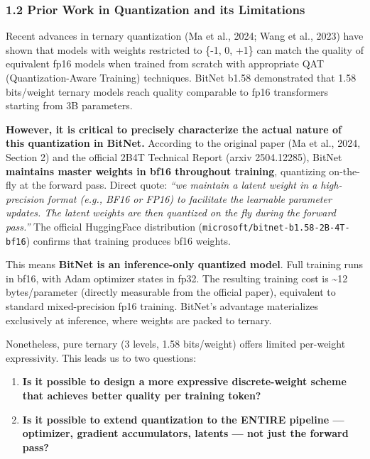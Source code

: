 \subsubsection{1.2 Prior Work in Quantization and its
Limitations}\label{prior-work-in-quantization-and-its-limitations}

Recent advances in ternary quantization (Ma et al., 2024; Wang et al.,
2023) have shown that models with weights restricted to \{-1, 0, +1\}
can match the quality of equivalent fp16 models when trained from
scratch with appropriate QAT (Quantization-Aware Training) techniques.
BitNet b1.58 demonstrated that 1.58 bits/weight ternary models reach
quality comparable to fp16 transformers starting from 3B parameters.

\textbf{However, it is critical to precisely characterize the actual
nature of this quantization in BitNet.} According to the original paper
(Ma et al., 2024, Section 2) and the official 2B4T Technical Report
(arxiv 2504.12285), BitNet \textbf{maintains master weights in bf16
throughout training}, quantizing on-the-fly at the forward pass. Direct
quote: \emph{``we maintain a latent weight in a high-precision format
(e.g., BF16 or FP16) to facilitate the learnable parameter updates. The
latent weights are then quantized on the fly during the forward pass.''}
The official HuggingFace distribution
(\texttt{microsoft/bitnet-b1.58-2B-4T-bf16}) confirms that training
produces bf16 weights.

This means \textbf{BitNet is an inference-only quantized model}. Full
training runs in bf16, with Adam optimizer states in fp32. The resulting
training cost is \textasciitilde12 bytes/parameter (directly measurable
from the official paper), equivalent to standard mixed-precision fp16
training. BitNet's advantage materializes exclusively at inference,
where weights are packed to ternary.

Nonetheless, pure ternary (3 levels, 1.58 bits/weight) offers limited
per-weight expressivity. This leads us to two questions:

\begin{enumerate}
\def\labelenumi{\arabic{enumi}.}
\tightlist
\item
  \textbf{Is it possible to design a more expressive discrete-weight
  scheme that achieves better quality per training token?}
\item
  \textbf{Is it possible to extend quantization to the ENTIRE pipeline
  --- optimizer, gradient accumulators, latents --- not just the forward
  pass?}
\end{enumerate}

